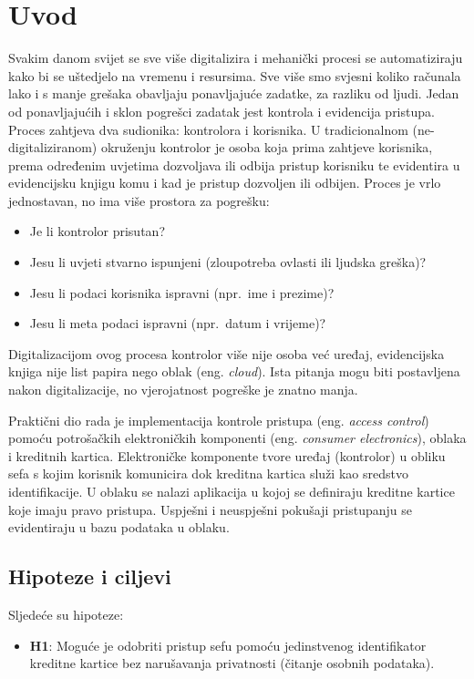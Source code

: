 \chapter{Uvod}

Svakim danom svijet se sve više digitalizira i mehanički procesi se automatiziraju kako bi se uštedjelo na vremenu i resursima.
Sve više smo svjesni koliko računala lako i s manje grešaka obavljaju ponavljajuće zadatke, za razliku od ljudi.
Jedan od ponavljajućih i sklon pogrešci zadatak jest kontrola i evidencija pristupa.
Proces zahtjeva dva sudionika: kontrolora i korisnika.
U tradicionalnom (ne-digitaliziranom) okruženju kontrolor je osoba koja prima zahtjeve korisnika, prema određenim uvjetima
dozvoljava ili odbija pristup korisniku te evidentira u evidencijsku knjigu komu i kad je pristup dozvoljen ili odbijen.
Proces je vrlo jednostavan, no ima više prostora za pogrešku:
\begin{itemize}
    \item Je li kontrolor prisutan?
    \item Jesu li uvjeti stvarno ispunjeni (zloupotreba ovlasti ili ljudska greška)?
    \item Jesu li podaci korisnika ispravni (npr.\ ime i prezime)?
    \item Jesu li meta podaci ispravni (npr.\ datum i vrijeme)?
\end{itemize}
Digitalizacijom ovog procesa kontrolor više nije osoba već uređaj, evidencijska knjiga nije list papira nego oblak (eng. \textit{cloud}).
Ista pitanja mogu biti postavljena nakon digitalizacije, no vjerojatnost pogreške je znatno manja.

Praktični dio rada je implementacija kontrole pristupa (eng. \textit{access control}) pomoću potrošačkih elektroničkih
komponenti (eng. \textit{consumer electronics}), oblaka i kreditnih kartica.
Elektroničke komponente tvore uređaj (kontrolor) u obliku sefa s kojim korisnik komunicira dok kreditna kartica služi kao sredstvo identifikacije.
U oblaku se nalazi aplikacija u kojoj se definiraju kreditne kartice koje imaju pravo pristupa.
Uspješni i neuspješni pokušaji pristupanju se evidentiraju u bazu podataka u oblaku.

\section{Hipoteze i ciljevi}

Sljedeće su hipoteze:

\begin{itemize}
    \item \textbf{H1}: Moguće je odobriti pristup sefu pomoću jedinstvenog identifikator kreditne kartice bez narušavanja privatnosti (čitanje osobnih podataka).
\end{itemize}

